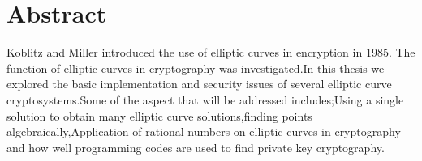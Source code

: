  \chapter*{Abstract}

Koblitz and Miller introduced the use of elliptic curves in encryption in 1985. The function of elliptic curves in cryptography was investigated.In this thesis we explored the basic implementation and security issues of several elliptic curve cryptosystems.Some of the aspect that will be addressed includes;Using a single solution to obtain many elliptic curve solutions,finding points algebraically,Application of rational numbers on elliptic curves in cryptography and how well programming codes are used to find private key cryptography.